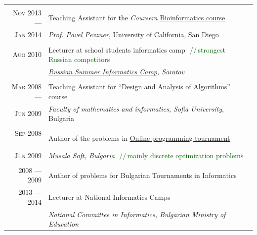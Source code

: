 \documentclass[a4paper,10pt]{article}
\def\myline{\color{linegray}\vline}
\newcommand{\minorcolor}[1]{\textcolor{mygray}{#1}}
\newcommand{\comment}[1]{\small\textcolor{darkgreen}{\,\,//\,#1}}
\newcommand{\mydate}[1]{\minorcolor{\textsc{#1}}}
\begin{document}
{{\begin{tabular}{r!{\myline}p{14cm}}
        \\
        \mydate{Nov 2013 ---}       &   Teaching Assistant for the \textit{Coursera} \href{https://www.coursera.org/course/bioinformatics}{Bioinformatics course}\\
        \mydate{Jan 2014}           &   \textit{Prof. Pavel Pevzner}, University of California, San Diego\\

        \\
        \mydate{Aug 2010}           &   Lecturer at school students informatics camp
                                        \comment{strongest Russian competitors}\\
                                    &   \textit{\href{http://lksh.ru/}{Russian Summer Informatics Camp}, Saratov}\\

        \\
        \mydate{Mar 2008 ---}       &   Teaching Assistant for ``Design and Analysis of Algorithms'' course\\
        \mydate{Jun 2009}           &   \textit{Faculty of mathematics and informatics, Sofia University}, Bulgaria\\

        \\
        \mydate{Sep 2008 ---}       &   Author of the problems in \href{http://konkurs.musala.com/}{Online programming tournament}\\
        \mydate{Jun 2009}           &   \textit{Musala Soft, Bulgaria}
                                        \comment{mainly discrete optimization problems}\\

        \\
        \mydate{2008 --- 2009}      &   Author of problems for Bulgarian Tournaments in Informatics\\
        \mydate{2013 --- 2014}      &   Lecturer at National Informatics Camps\\
                                    &   \textit{National Committee in Informatics, Bulgarian Ministry of Education}\\
\end{tabular}
}  %

}
\end{document}
